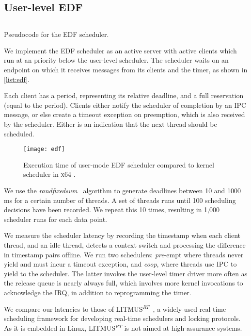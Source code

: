 \subsection{User-level EDF}\label{s:edf-impl}

\begin{listing}
\inputminted{c}{code/edf.c}
\caption{Pseudocode for the EDF scheduler.}
\label{list:edf}
\end{listing}

We implement the EDF scheduler as an active server with active
clients which run at an \selfour priority below the user-level scheduler.
The scheduler waits on an endpoint on which it receives messages from
its clients and the timer, as shown in \cref{list:edf}.

Each client has a period, representing its relative deadline, and a full reservation (equal to the period). Clients
either notify the scheduler of completion by an IPC
message, or else create a timeout exception on preemption, which is also received by the
scheduler. Either is an indication that the next thread should be scheduled.

\begin{figure}[t]
\centering
\texttt{[image: edf]}
\caption[Results of \selfour user-level EDF versus \litmus.]{Execution time of \selfour user-mode EDF scheduler compared to
         kernel scheduler in \textsc{x64} \litmus.}
\label{f:edf}
\end{figure}


We use the \emph{randfixedsum}~\citep{Emberson_SD_10} algorithm to
generate deadlines between 10 and 1000\,ms for a certain number of threads.
A set of threads runs until 100
scheduling decisions have been recorded. We repeat this 10 times,
resulting in 1,000 scheduler runs for each data point.

We measure the scheduler latency by recording the timestamp when each client thread, and an idle
thread, detects a
context switch and processing the difference in timestamp pairs offline. We run two schedulers:
\emph{pre}-empt where threads never yield and must incur a timeout exception, and \emph{coop}, where
threads use IPC to yield to the scheduler. The latter invokes the user-level timer
driver more often as the release queue is nearly always full, which involves more kernel invocations
to acknowledge the IRQ, in addition to reprogramming the timer.

We compare our latencies to those of
LITMUS$^{RT}$~\citep{Calandrino_LBDA_06}, a widely-used real-time scheduling
framework for developing real-time schedulers and locking protocols. 
As it is  embedded in Linux, LITMUS$^{RT}$ is not aimed at high-assurance systems.

